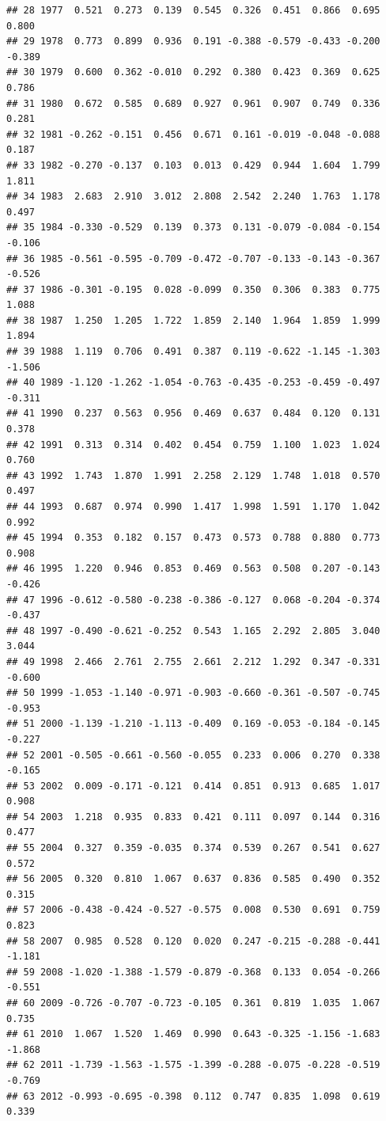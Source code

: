 \documentclass[]{article}
\begin{document}
\begin{verbatim}
## 28 1977  0.521  0.273  0.139  0.545  0.326  0.451  0.866  0.695  0.800
## 29 1978  0.773  0.899  0.936  0.191 -0.388 -0.579 -0.433 -0.200 -0.389
## 30 1979  0.600  0.362 -0.010  0.292  0.380  0.423  0.369  0.625  0.786
## 31 1980  0.672  0.585  0.689  0.927  0.961  0.907  0.749  0.336  0.281
## 32 1981 -0.262 -0.151  0.456  0.671  0.161 -0.019 -0.048 -0.088  0.187
## 33 1982 -0.270 -0.137  0.103  0.013  0.429  0.944  1.604  1.799  1.811
## 34 1983  2.683  2.910  3.012  2.808  2.542  2.240  1.763  1.178  0.497
## 35 1984 -0.330 -0.529  0.139  0.373  0.131 -0.079 -0.084 -0.154 -0.106
## 36 1985 -0.561 -0.595 -0.709 -0.472 -0.707 -0.133 -0.143 -0.367 -0.526
## 37 1986 -0.301 -0.195  0.028 -0.099  0.350  0.306  0.383  0.775  1.088
## 38 1987  1.250  1.205  1.722  1.859  2.140  1.964  1.859  1.999  1.894
## 39 1988  1.119  0.706  0.491  0.387  0.119 -0.622 -1.145 -1.303 -1.506
## 40 1989 -1.120 -1.262 -1.054 -0.763 -0.435 -0.253 -0.459 -0.497 -0.311
## 41 1990  0.237  0.563  0.956  0.469  0.637  0.484  0.120  0.131  0.378
## 42 1991  0.313  0.314  0.402  0.454  0.759  1.100  1.023  1.024  0.760
## 43 1992  1.743  1.870  1.991  2.258  2.129  1.748  1.018  0.570  0.497
## 44 1993  0.687  0.974  0.990  1.417  1.998  1.591  1.170  1.042  0.992
## 45 1994  0.353  0.182  0.157  0.473  0.573  0.788  0.880  0.773  0.908
## 46 1995  1.220  0.946  0.853  0.469  0.563  0.508  0.207 -0.143 -0.426
## 47 1996 -0.612 -0.580 -0.238 -0.386 -0.127  0.068 -0.204 -0.374 -0.437
## 48 1997 -0.490 -0.621 -0.252  0.543  1.165  2.292  2.805  3.040  3.044
## 49 1998  2.466  2.761  2.755  2.661  2.212  1.292  0.347 -0.331 -0.600
## 50 1999 -1.053 -1.140 -0.971 -0.903 -0.660 -0.361 -0.507 -0.745 -0.953
## 51 2000 -1.139 -1.210 -1.113 -0.409  0.169 -0.053 -0.184 -0.145 -0.227
## 52 2001 -0.505 -0.661 -0.560 -0.055  0.233  0.006  0.270  0.338 -0.165
## 53 2002  0.009 -0.171 -0.121  0.414  0.851  0.913  0.685  1.017  0.908
## 54 2003  1.218  0.935  0.833  0.421  0.111  0.097  0.144  0.316  0.477
## 55 2004  0.327  0.359 -0.035  0.374  0.539  0.267  0.541  0.627  0.572
## 56 2005  0.320  0.810  1.067  0.637  0.836  0.585  0.490  0.352  0.315
## 57 2006 -0.438 -0.424 -0.527 -0.575  0.008  0.530  0.691  0.759  0.823
## 58 2007  0.985  0.528  0.120  0.020  0.247 -0.215 -0.288 -0.441 -1.181
## 59 2008 -1.020 -1.388 -1.579 -0.879 -0.368  0.133  0.054 -0.266 -0.551
## 60 2009 -0.726 -0.707 -0.723 -0.105  0.361  0.819  1.035  1.067  0.735
## 61 2010  1.067  1.520  1.469  0.990  0.643 -0.325 -1.156 -1.683 -1.868
## 62 2011 -1.739 -1.563 -1.575 -1.399 -0.288 -0.075 -0.228 -0.519 -0.769
## 63 2012 -0.993 -0.695 -0.398  0.112  0.747  0.835  1.098  0.619  0.339

\end{verbatim}
\end{document}
